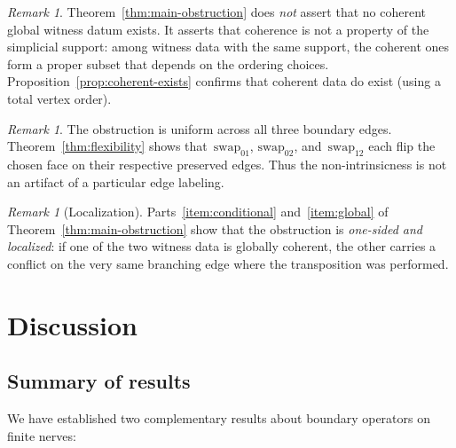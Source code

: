 \documentclass[11pt,a4paper]{article}
\theoremstyle{plain}
\theoremstyle{definition}
\theoremstyle{remark}
\newtheorem{remark}[theorem]{Remark}
\newcommand{\swapAB}{\mathrm{swap}_{01}}
\newcommand{\swapAC}{\mathrm{swap}_{02}}
\newcommand{\swapBC}{\mathrm{swap}_{12}}
\begin{document}
\begin{remark}
\label{rem:not-impossibility}
Theorem~\ref{thm:main-obstruction} does \emph{not} assert that no
coherent global witness datum exists. It asserts that coherence is
not a property of the simplicial support: among witness data with the
same support, the coherent ones form a proper subset that depends on the
ordering choices. Proposition~\ref{prop:coherent-exists} confirms that
coherent data do exist (using a total vertex order).
\end{remark}

\begin{remark}
\label{rem:all-edges}
The obstruction is uniform across all three boundary edges.
Theorem~\ref{thm:flexibility} shows that~$\swapAB$, $\swapAC$,
and~$\swapBC$ each flip the chosen face on their respective preserved
edges. Thus the non-intrinsicness is not an artifact of a particular
edge labeling.
\end{remark}

\begin{remark}[Localization]
\label{rem:localization}
Parts~\ref{item:conditional} and~\ref{item:global} of
Theorem~\ref{thm:main-obstruction} show that the obstruction is
\emph{one-sided and localized}: if one of the two witness data is
globally coherent, the other carries a conflict on the very same
branching edge where the transposition was performed.
\end{remark}

\section{Discussion}
\label{sec:discussion}

\subsection{Summary of results}

We have established two complementary results about boundary operators
on finite nerves:
\end{document}
